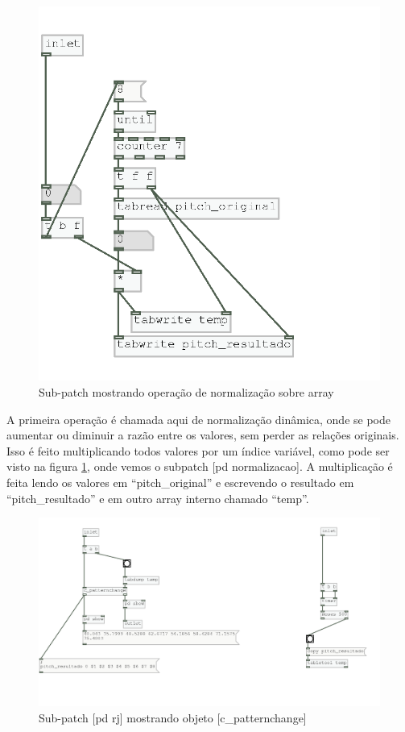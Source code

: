 \documentclass{ppgmus}
\begin{document}
\begin{figure}
\includegraphics[scale=.6]{variacao-normalizacao}
\caption{Sub-patch mostrando operação de normalização sobre array}
\label{variacoes-normalizacao}
\end{figure}  

A primeira operação é chamada aqui de normalização dinâmica, onde
se pode aumentar ou diminuir a razão entre os valores, sem perder
as relações originais. Isso é feito multiplicando todos valores por
um índice variável, como pode ser visto na figura \ref{variacoes-normalizacao},
onde vemos o subpatch [pd normalizacao]. A multiplicação é feita lendo
os valores em ``pitch\_original'' e escrevendo o resultado em ``pitch\_resultado'' e 
em outro array interno chamado ``temp''.



\begin{figure}
\includegraphics[scale=.6]{variacoes-interno}
\caption{Sub-patch [pd rj] mostrando objeto [c\_patternchange]}
\label{variacoes-interno}
\end{figure}  
\end{document}
